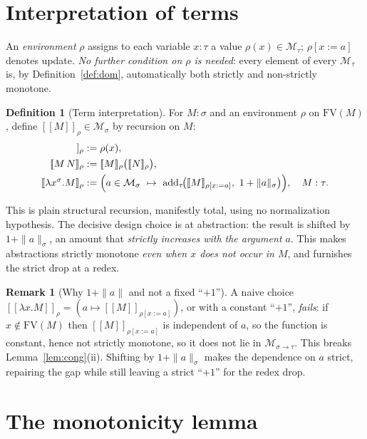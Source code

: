 \documentclass{amsart}
\theoremstyle{definition}
\newtheorem{definition}{Definition}
\newtheorem{remark}{Remark}
\newcommand{\interp}[1]{[\![#1]\!]}
\newcommand{\FV}{\mathrm{FV}}
\begin{document}
\section{Interpretation of terms}

An \emph{environment} $\rho$ assigns to each variable $x:\tau$ a value
$\rho(x)\in\mathcal M_\tau$; $\rho[x:=a]$ denotes update. \emph{No further condition on
$\rho$ is needed}: every element of every $\mathcal M_\tau$ is, by
Definition~\ref{def:dom}, automatically both strictly and non-strictly monotone.

\begin{definition}[Term interpretation]\label{def:interp}
For $M:\sigma$ and an environment $\rho$ on $\FV(M)$, define $\interp{M}_\rho\in\mathcal M_\sigma$
by recursion on $M$:
\begin{align*}
  \interp{x}_\rho &:= \rho(x),\\
  \interp{M\,N}_\rho &:= \interp{M}_\rho\bigl(\interp{N}_\rho\bigr),\\
  \interp{\lambda x^\sigma.M}_\rho &:=
     \Bigl(a\in\mathcal M_\sigma\ \mapsto\
       \mathrm{add}_\tau\!\bigl(\interp{M}_{\rho[x:=a]},\ 1+\|a\|_\sigma\bigr)\Bigr),
     \quad M:\tau .
\end{align*}
\end{definition}

This is plain structural recursion, manifestly total, using no normalization hypothesis.
The decisive design choice is at abstraction: the result is shifted by $1+\|a\|_\sigma$, an
amount that \emph{strictly increases with the argument $a$}. This makes abstractions
strictly monotone \emph{even when $x$ does not occur in $M$}, and furnishes the strict drop
at a redex.

\begin{remark}[Why $1+\|a\|$ and not a fixed ``$+1$'']\label{rem:why}
A naive choice $\interp{\lambda x.M}_\rho=(a\mapsto\interp{M}_{\rho[x:=a]})$, or with a
constant ``$+1$'', \emph{fails}: if $x\notin\FV(M)$ then $\interp{M}_{\rho[x:=a]}$ is
independent of $a$, so the function is constant, hence not strictly monotone, so it does not
lie in $\mathcal M_{\sigma\to\tau}$. This breaks Lemma~\ref{lem:cong}(ii). Shifting by
$1+\|a\|_\sigma$ makes the dependence on $a$ strict, repairing the gap while still leaving a
strict ``$+1$'' for the redex drop.
\end{remark}

\section{The monotonicity lemma}
\end{document}
